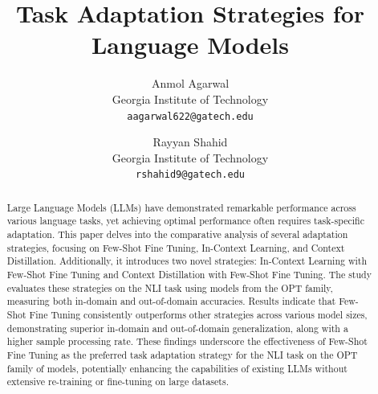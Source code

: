 \documentclass[10pt,twocolumn,letterpaper]{article}
\begin{document}
\title{Task Adaptation Strategies for Language Models}

\author{Anmol Agarwal\\
	Georgia Institute of Technology\\
	{\tt\small aagarwal622@gatech.edu}
	\and
	Rayyan Shahid\\
	Georgia Institute of Technology\\
	{\tt\small rshahid9@gatech.edu}
}

\maketitle




\begin{abstract}
	Large Language Models (LLMs) have demonstrated remarkable performance across various language tasks, yet achieving optimal performance often requires task-specific adaptation. This paper delves into the comparative analysis of several adaptation strategies, focusing on Few-Shot Fine Tuning, In-Context Learning, and Context Distillation. Additionally, it introduces two novel strategies: In-Context Learning with Few-Shot Fine Tuning and Context Distillation with Few-Shot Fine Tuning. The study evaluates these strategies on the NLI task using models from the OPT family, measuring both in-domain and out-of-domain accuracies. Results indicate that Few-Shot Fine Tuning consistently outperforms other strategies across various model sizes, demonstrating superior in-domain and out-of-domain generalization, along with a higher sample processing rate. These findings underscore the effectiveness of Few-Shot Fine Tuning as the preferred task adaptation strategy for the NLI task on the OPT family of models, potentially enhancing the capabilities of existing LLMs without extensive re-training or fine-tuning on large datasets.


\end{abstract}
\end{document}
